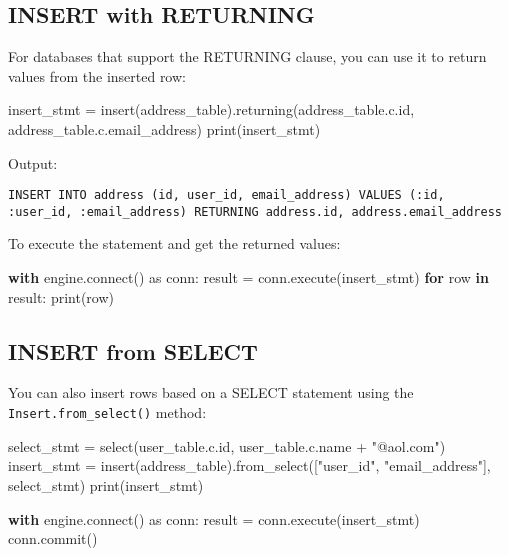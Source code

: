\documentclass[
  letterpaper,
  DIV=11,
  numbers=noendperiod]{scrreprt}
\newenvironment{Shaded}{\begin{snugshade}}{\end{snugshade}}
\newcommand{\BuiltInTok}[1]{\textcolor[rgb]{0.00,0.23,0.31}{#1}}
\newcommand{\ControlFlowTok}[1]{\textcolor[rgb]{0.00,0.23,0.31}{\textbf{#1}}}
\newcommand{\ExtensionTok}[1]{\textcolor[rgb]{0.00,0.23,0.31}{#1}}
\newcommand{\ImportTok}[1]{\textcolor[rgb]{0.00,0.46,0.62}{#1}}
\newcommand{\KeywordTok}[1]{\textcolor[rgb]{0.00,0.23,0.31}{\textbf{#1}}}
\newcommand{\NormalTok}[1]{\textcolor[rgb]{0.00,0.23,0.31}{#1}}
\newcommand{\OperatorTok}[1]{\textcolor[rgb]{0.37,0.37,0.37}{#1}}
\newcommand{\StringTok}[1]{\textcolor[rgb]{0.13,0.47,0.30}{#1}}
\begin{document}
\subsection{INSERT with RETURNING}\label{insert-with-returning}

For databases that support the RETURNING clause, you can use it to
return values from the inserted row:

\begin{Shaded}
\begin{Highlighting}[]
\NormalTok{insert\_stmt }\OperatorTok{=}\NormalTok{ insert(address\_table).returning(address\_table.c.}\BuiltInTok{id}\NormalTok{, address\_table.c.email\_address)}
\BuiltInTok{print}\NormalTok{(insert\_stmt)}
\end{Highlighting}
\end{Shaded}

Output:

\begin{verbatim}
INSERT INTO address (id, user_id, email_address) VALUES (:id, :user_id, :email_address) RETURNING address.id, address.email_address
\end{verbatim}

To execute the statement and get the returned values:

\begin{Shaded}
\begin{Highlighting}[]
\ControlFlowTok{with}\NormalTok{ engine.}\ExtensionTok{connect}\NormalTok{() }\ImportTok{as}\NormalTok{ conn:}
\NormalTok{    result }\OperatorTok{=}\NormalTok{ conn.execute(insert\_stmt)}
    \ControlFlowTok{for}\NormalTok{ row }\KeywordTok{in}\NormalTok{ result:}
        \BuiltInTok{print}\NormalTok{(row)}
\end{Highlighting}
\end{Shaded}

\subsection{INSERT from SELECT}\label{insert-from-select}

You can also insert rows based on a SELECT statement using the
\texttt{Insert.from\_select()} method:

\begin{Shaded}
\begin{Highlighting}[]
\NormalTok{select\_stmt }\OperatorTok{=}\NormalTok{ select(user\_table.c.}\BuiltInTok{id}\NormalTok{, user\_table.c.name }\OperatorTok{+} \StringTok{"@aol.com"}\NormalTok{)}
\NormalTok{insert\_stmt }\OperatorTok{=}\NormalTok{ insert(address\_table).from\_select([}\StringTok{"user\_id"}\NormalTok{, }\StringTok{"email\_address"}\NormalTok{], select\_stmt)}
\BuiltInTok{print}\NormalTok{(insert\_stmt)}

\ControlFlowTok{with}\NormalTok{ engine.}\ExtensionTok{connect}\NormalTok{() }\ImportTok{as}\NormalTok{ conn:}
\NormalTok{    result }\OperatorTok{=}\NormalTok{ conn.execute(insert\_stmt)}
\NormalTok{    conn.commit()}
\end{Highlighting}
\end{Shaded}
\end{document}
